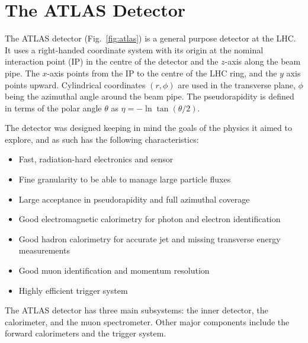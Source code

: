 % 


\section{The ATLAS Detector}

The ATLAS detector (Fig.~\ref{fig:atlas}) is a general purpose detector at the LHC. It uses a right-handed coordinate system with its origin at the nominal interaction point (IP) in the centre of the detector and the $z$-axis along the beam pipe. The $x$-axis points from the IP to the centre of the LHC ring, and the $y$ axis points upward. Cylindrical coordinates $(r,\phi)$ are used in the transverse plane, $\phi$ being the azimuthal angle around the beam pipe. The pseudorapidity is defined in terms of the polar angle $\theta$ as $\eta=-\ln\tan(\theta/2)$.

The detector was designed keeping in mind the goals of the physics it aimed to explore, and as such has the following characteristics:
\begin{itemize}
\item Fast, radiation-hard electronics and sensor
\item Fine granularity to be able to manage large particle fluxes
\item Large acceptance in pseudorapidity and full azimuthal coverage
\item Good electromagnetic calorimetry for photon and electron identification
\item Good hadron calorimetry for accurate jet and missing transverse energy measurements
\item Good muon identification and momentum resolution
\item Highly efficient trigger system 
\end{itemize}

The ATLAS detector has three main subsystems: the inner detector, the calorimeter, and the muon spectrometer. Other major components include the forward calorimeters and the trigger system.

